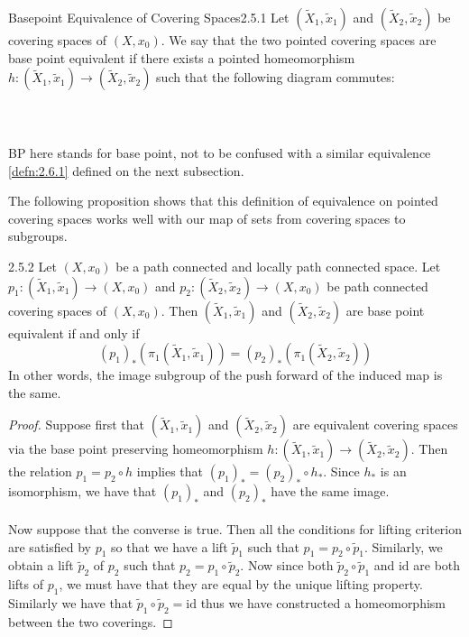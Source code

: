 \documentclass[a4paper]{article}
\begin{document}
\begin{defn}{Basepoint Equivalence of Covering Spaces}{2.5.1} Let $(\tilde{X}_1,\tilde{x}_1)$ and $(\tilde{X}_2,\tilde{x}_2)$ be covering spaces of $(X,x_0)$. We say that the two pointed covering spaces are base point equivalent if there exists a pointed homeomorphism $h:(\tilde{X}_1,\tilde{x}_1)\to(\tilde{X}_2,\tilde{x}_2)$ such that the following diagram commutes: \\~\\
\\~\\
BP here stands for base point, not to be confused with a similar equivalence \ref{defn:2.6.1} defined on the next subsection. 
\end{defn}

The following proposition shows that this definition of equivalence on pointed covering spaces works well with our map of sets from covering spaces to subgroups. 

\begin{prp}{}{2.5.2} Let $(X,x_0)$ be a path connected and locally path connected space. Let $p_1:(\tilde{X}_1,\tilde{x}_1)\to(X,x_0)$ and $p_2:(\tilde{X}_2,\tilde{x}_2)\to(X,x_0)$ be path connected covering spaces of $(X,x_0)$. Then $(\tilde{X}_1,\tilde{x}_1)$ and $(\tilde{X}_2,\tilde{x}_2)$ are base point equivalent if and only if $$(p_1)_\ast\left(\pi_1(\tilde{X}_1,\tilde{x}_1)\right)=(p_2)_\ast\left(\pi_1(\tilde{X}_2,\tilde{x}_2)\right)$$ In other words, the image subgroup of the push forward of the induced map is the same. \tcbline
\begin{proof}
Suppose first that $(\tilde{X}_1,\tilde{x}_1)$ and $(\tilde{X}_2,\tilde{x}_2)$ are equivalent covering spaces via the base point preserving homeomorphism $h:(\tilde{X}_1,\tilde{x}_1)\to(\tilde{X}_2,\tilde{x}_2)$. Then the relation $p_1=p_2\circ h$ implies that $(p_1)_\ast=(p_2)_\ast\circ h_\ast$. Since $h_\ast$ is an isomorphism, we have that $(p_1)_\ast$ and $(p_2)_\ast$ have the same image. \\~\\

Now suppose that the converse is true. Then all the conditions for lifting criterion are satisfied by $p_1$ so that we have a lift $\tilde{p}_1$ such that $p_1=p_2\circ\tilde{p}_1$. Similarly, we obtain a lift $\tilde{p}_2$ of $p_2$ such that $p_2=p_1\circ\tilde{p}_2$. Now since both $\tilde{p}_2\circ\tilde{p}_1$ and $\text{id}$ are both lifts of $p_1$, we must have that they are equal by the unique lifting property. Similarly we have that $\tilde{p}_1\circ\tilde{p}_2=\text{id}$ thus we have constructed a homeomorphism between the two coverings. 
\end{proof}
\end{prp}
\end{document}
